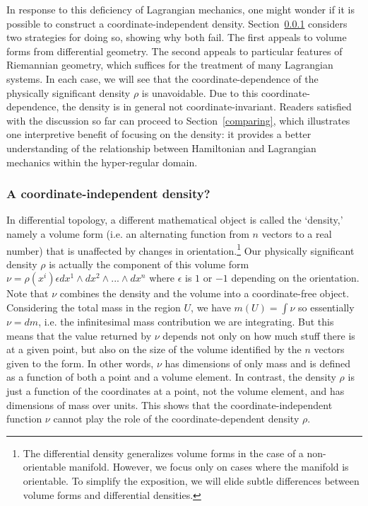 \documentclass[letterpaper]{article}
\begin{document}
In response to this deficiency of Lagrangian mechanics, one might wonder if it is possible to construct a coordinate-independent density. Section~\ref{independence} considers two strategies for doing so, showing why both fail. The first appeals to volume forms from differential geometry. The second appeals to particular features of Riemannian geometry, which suffices for the treatment of many Lagrangian systems. In each case, we will see that the coordinate-dependence of the physically significant density $\rho$ is unavoidable. Due to this coordinate-dependence, the density is in general not coordinate-invariant. Readers satisfied with the discussion so far can proceed to Section~\ref{comparing}, which illustrates one interpretive benefit of focusing on the density: it provides a better understanding of the relationship between Hamiltonian and Lagrangian mechanics within the hyper-regular domain. 

\subsubsection{A coordinate-independent density?}
\label{independence}

In differential topology, a different mathematical object is called the `density,' namely a volume form (i.e. an alternating function from $n$ vectors to a real number) that is unaffected by changes in orientation.\footnote{The differential density generalizes volume forms in the case of a non-orientable manifold. However, we focus only on cases where the manifold is orientable. To simplify the exposition, we will elide subtle differences between volume forms and differential densities.} Our physically significant density $\rho$ is actually the component of this volume form $\nu = \rho(x^i)  \epsilon dx^1 \wedge dx^2 \wedge ... \wedge dx^n$ where $\epsilon$ is $1$ or $-1$ depending on the orientation. Note that $\nu$ combines the density and the volume into a coordinate-free object. Considering the total mass in the region $U$, we have $m(U) = \int \nu$ so essentially $\nu = dm$, i.e. the infinitesimal mass contribution we are integrating. But this means that the value returned by $\nu$ depends not only on how much stuff there is at a given point, but also on the size of the volume identified by the $n$ vectors given to the form. In other words, $\nu$ has dimensions of only mass and is defined as a function of both a point and a volume element. In contrast, the density $\rho$ is just a function of the coordinates at a point, not the volume element, and has dimensions of mass over units. This shows that the coordinate-independent function $\nu$ cannot play the role of the coordinate-dependent density $\rho$. 
\end{document}
